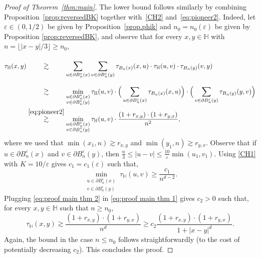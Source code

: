 \documentclass[11pt,a4paper]{article}
\numberwithin{equation}{section}
\theoremstyle{plain}
\theoremstyle{definition}
\begin{document}
\begin{proof}[Proof of Theorem~\textup{\ref{thm:main}}]
The lower bound follows similarly by combining Proposition~\ref{prop:reversedBK} together with~\eqref{CH2} and~\eqref{eq:pioneer2}. Indeed, let $\varepsilon\in (0,1/2)$ be given by Proposition~\ref{prop.phik} and $n_0=n_0(\varepsilon)$ be given by Proposition \ref{prop:reversedBK}, and observe that for every $x,y\in \mathbb H$ with $n=\lfloor|x-y|/3\rfloor\geq n_0$,
\begin{align}\label{eq:proof main thm 1}
\begin{split}	
\tau_{\mathbb H}(x,y) & \stackrel{\phantom{\eqref{eq:pioneer2}}}\gtrsim \sum_{u\in \partial B_n^\varepsilon(x)} \sum_{v\in \partial B_n^\varepsilon(y)} \tau_{B_n(x)}(x,u) \cdot \tau_{\mathbb H}(u,v) \cdot \tau_{B_n(y)}(v,y)\\ 
& \stackrel{\phantom{\eqref{eq:pioneer2}}}\gtrsim  \min_{\substack{u\in \partial B_n^\varepsilon(x)\\v\in \partial B_n^\varepsilon(y)}}\tau_{\mathbb H}(u,v)\cdot  \Big(\sum_{u\in \partial B_n^\varepsilon(x)} \tau_{B_n(x)}(x,u)\Big) \cdot \Big(\sum_{v\in \partial B_n^\varepsilon(y)} \tau_{B_n(y)}(y,v)\Big) \\&\stackrel{\eqref{eq:pioneer2}}\gtrsim  \min_{\substack{u\in \partial B_n^\varepsilon(x)\\v\in \partial B_n^\varepsilon(y)}}\tau_{\mathbb H}(u,v)\cdot\frac{(1+r_{x,y}) \cdot (1+r_{y,x})}{n^2},
\end{split} 
\end{align}
where we used that $\min(x_1,n)\gtrsim r_{x,y}$ and $\min(y_1,n)\gtrsim r_{y,x}$. Observe that if $u\in \partial B_n^\varepsilon(x)$ and $v\in \partial B_n^\varepsilon(y)$, then $\tfrac{n}{3}\leq |u-v|\leq \frac{10}{\varepsilon}\min(u_1,v_1)$. Using \eqref{CH1} with $K=10/\varepsilon$ gives $c_1=c_1(\varepsilon)$ such that,
\begin{equation}\label{eq:proof main thm 2}
	\min_{\substack{u\in \partial B_n^\varepsilon(x)\\v\in \partial B_n^\varepsilon(y)}}\tau_{\mathbb H}(u,v)\geq \frac{c_1}{n^{d-2}}.
\end{equation}
Plugging \eqref{eq:proof main thm 2} in \eqref{eq:proof main thm 1} gives $c_2>0$ such that, for every $x,y\in \mathbb H$ such that $n\geq n_0$,
\begin{equation}
	\tau_{\mathbb H}(x,y)\gtrsim \frac{(1+r_{x,y}) \cdot (1+r_{y,x})}{n^d}\geq c_2 \frac { (1+ r_{x,y}) \cdot (1+ r_{y,x})}{1+ |x-y|^d}.
\end{equation}
Again, the bound in the case $n\leq n_0$ follows straightforwardly (to the cost of potentially decreasing $c_2$). This concludes the proof.
\end{proof}
\end{document}
